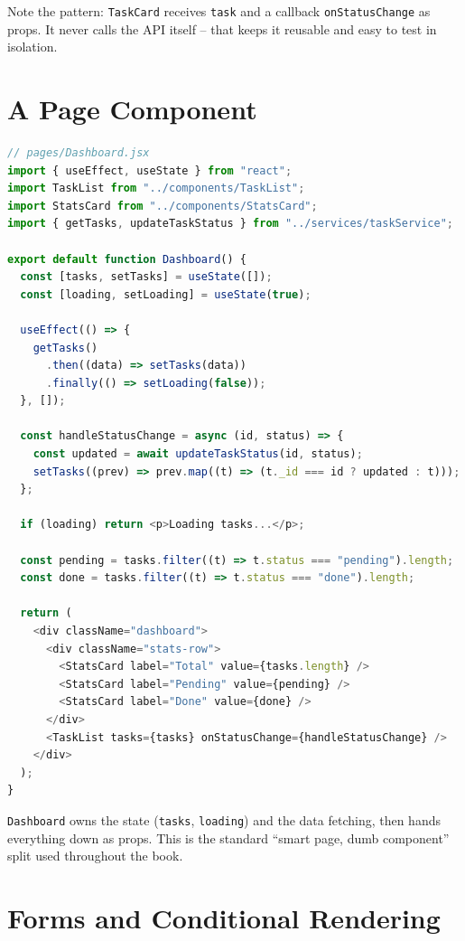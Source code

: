 Note the pattern: \texttt{TaskCard} receives \texttt{task} and a callback
\texttt{onStatusChange} as props. It never calls the API itself -- that keeps it
reusable and easy to test in isolation.

\section{A Page Component}

\begin{lstlisting}[language=JavaScript]
// pages/Dashboard.jsx
import { useEffect, useState } from "react";
import TaskList from "../components/TaskList";
import StatsCard from "../components/StatsCard";
import { getTasks, updateTaskStatus } from "../services/taskService";

export default function Dashboard() {
  const [tasks, setTasks] = useState([]);
  const [loading, setLoading] = useState(true);

  useEffect(() => {
    getTasks()
      .then((data) => setTasks(data))
      .finally(() => setLoading(false));
  }, []);

  const handleStatusChange = async (id, status) => {
    const updated = await updateTaskStatus(id, status);
    setTasks((prev) => prev.map((t) => (t._id === id ? updated : t)));
  };

  if (loading) return <p>Loading tasks...</p>;

  const pending = tasks.filter((t) => t.status === "pending").length;
  const done = tasks.filter((t) => t.status === "done").length;

  return (
    <div className="dashboard">
      <div className="stats-row">
        <StatsCard label="Total" value={tasks.length} />
        <StatsCard label="Pending" value={pending} />
        <StatsCard label="Done" value={done} />
      </div>
      <TaskList tasks={tasks} onStatusChange={handleStatusChange} />
    </div>
  );
}
\end{lstlisting}

\texttt{Dashboard} owns the state (\texttt{tasks}, \texttt{loading}) and the data
fetching, then hands everything down as props. This is the standard
``smart page, dumb component'' split used throughout the book.

\section{Forms and Conditional Rendering}

